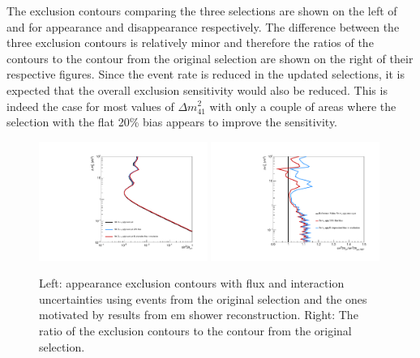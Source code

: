 The exclusion contours comparing the three selections are shown on the left of  and  for \nue appearance and disappearance respectively. The difference between the three exclusion contours is relatively minor and therefore the ratios of the contours to the contour from the original selection are shown on the right of their respective figures. Since the event rate is reduced in the updated selections, it is expected that the overall exclusion sensitivity would also be reduced. This is indeed the case for most values of $\Delta m^2_{41}$ with only a couple of areas where the selection with the flat 20\% bias appears to improve the sensitivity.

\begin{figure}[h!]
    \centering
    \includegraphics[width = 0.49\textwidth]{figures-chap6/exclusion_contours/bias/nue_app_03d1.pdf}
    \includegraphics[width = 0.49\textwidth]{figures-chap6/exclusion_contours/bias/nue_app_03d1_ratio.pdf}
    \caption[\nue appearance exclusion contours using events from the selection motivated by \gls{em} shower reconstruction.]{Left: \nue appearance exclusion contours with flux and interaction uncertainties using events from the original selection and the ones motivated by results from \gls{em} shower reconstruction. Right: The ratio of the exclusion contours to the contour from the original selection.}
    \label{fig:nue_app_bias}
\end{figure}

